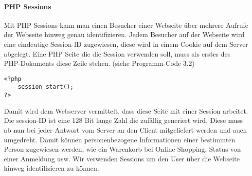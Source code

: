 \paragraph{PHP Sessions}
Mit PHP Sessions kann man einen Besucher einer Webseite über mehrere Aufrufe der Webseite hinweg genau identifizieren. Jedem Besucher auf der Webseite wird eine eindeutige Session-ID zugewiesen, diese wird in einem Cookie auf dem Server abgelegt. Eine PHP Seite die die Session verwenden soll, muss als erstes des PHP-Dokuments diese Zeile stehen. (siehe Programm-Code 3.2)
\begin{lstlisting}[style=customPHP, caption={Session}]
<?php
	session_start();
?>
\end{lstlisting}

Damit wird dem Webserver vermittelt, dass diese Seite mit einer Session arbeitet.\\
Die session-ID ist eine 128 Bit lange Zahl die zufällig generiert wird. Diese muss ab nun bei jeder Antwort vom Server an den Client mitgeliefert werden und auch umgedreht. Damit können personenbezogene Informationen einer bestimmten Person zugewiesen werden, wie ein Warenkorb bei Online-Shopping, Status von einer Anmeldung usw. Wir verwenden Sessions um den User über die Webseite hinweg identifizieren zu können. 
